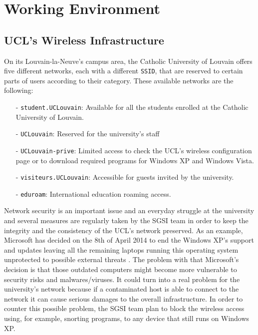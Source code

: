
\chapter{Working Environment} %

\label{Chapter2} %




\section{UCL's Wireless Infrastructure}

On its Louvain-la-Neuve's campus area, the Catholic University of Louvain offers five different networks, each with a different \texttt{SSID}, that are reserved to certain parts of users according to their category. These available networks are the following:
\begin{itemize}
	\item[-] \texttt{student.UCLouvain}: Available for all the students enrolled at the Catholic University of Louvain.
	\item[-] \texttt{UCLouvain}: Reserved for the university's staff
	\item[-] \texttt{UCLouvain-prive}: Limited access to check the UCL's wireless configuration page or to download required programs for Windows XP and Windows Vista.
	\item[-] \texttt{visiteurs.UCLouvain}: Accessible for guests invited by the university.
	\item[-] \texttt{eduroam}: International education roaming access.
\end{itemize}

Network security is an important issue and an everyday struggle at the university and several measures are regularly taken by the SGSI team in order to keep the integrity and the consistency of the UCL's network preserved. As an example, Microsoft has decided on the 8th of April 2014 to end the Windows XP's support and updates leaving all the remaining laptops running this operating system unprotected to possible external threats \cite{windows}. The problem with that Microsoft's decision is that those outdated computers might become more vulnerable to security risks and malwares/viruses. It could turn into a real problem for the university's network because if a contaminated host is able to connect to the network it can cause serious damages to the overall infrastructure. In order to counter this possible problem, the SGSI team plan to block the wireless access using, for example, snorting programs, to any device that still runs on Windows XP.

